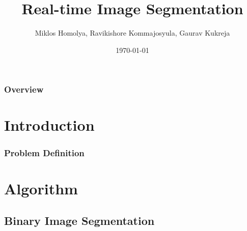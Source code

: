 \documentclass{beamer}
\title{Real-time Image Segmentation} %
\author{Miklos Homolya, Ravikishore Kommajosyula, Gaurav Kukreja} %
\institute[TUM] %
{
Technical University of Munich \\ %
\medskip
}
\date{\today} %
\begin{document}

\begin{frame}
\titlepage %
\end{frame}

\begin{frame}
\frametitle{Overview} %
\tableofcontents %
\end{frame}


\section{Introduction} %

\begin{frame}
\frametitle{Problem Definition}

\end{frame}


\section{Algorithm}

\subsection{Binary Image Segmentation}
\end{document}
